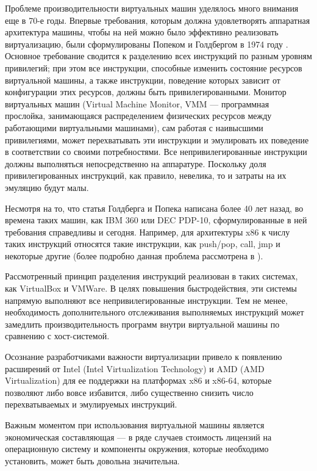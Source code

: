 Проблеме производительности виртуальных машин уделялось много внимания еще в 70-е годы. Впервые требования, которым должна удовлетворять аппаратная архитектура машины, чтобы на ней можно было эффективно реализовать виртуализацию, были сформулированы Попеком и Голдбергом в 1974 году \cite{popek1974formal}. Основное требование сводится к разделению всех инструкций по разным уровням привилегий; при этом все инструкции, способные изменить состояние ресурсов виртуальной машины, а также инструкции, поведение которых зависит от конфигурации этих ресурсов, должны быть привилегированными. Монитор виртуальных машин (Virtual Machine Monitor, VMM — программная прослойка, занимающаяся распределением физических ресурсов между работающими виртуальными машинами), сам работая с наивысшими привилегиями, может перехватывать эти инструкции и эмулировать их поведение в соответствии со своими потребностями. Все непривилегированные инструкции должны выполняться непосредственно на аппаратуре. Поскольку доля привилегированных инструкций, как правило, невелика, то и затраты на их эмуляцию будут малы.

Несмотря на то, что статья Голдберга и Попека написана более 40 лет назад, во времена таких машин, как IBM 360 или DEC PDP-10, сформулированные в ней требования справедливы и сегодня. Например, для архитектуры x86 к числу таких инструкций относятся такие инструкции, как push/pop, call, jmp и некоторые другие (более подробно данная проблема рассмотрена в \cite{kasp}).

Рассмотренный принцип разделения инструкций реализован в таких системах, как VirtualBox\cite{virtualbox} и VMWare\cite{vmware}. В целях повышения быстродействия, эти системы напрямую выполняют все непривилегированные инструкции. Тем не менее, необходимость дополнительного отслеживания выполняемых инструкций может замедлить производительность программ внутри виртуальной машины по сравнению с хост-системой.

Осознание разработчиками важности виртуализации привело к появлению расширений от Intel (Intel Virtualization Technology\cite{vtx}) и AMD (AMD Virtualization\cite{amd}) для ее поддержки на платформах x86 и x86-64, которые позволяют либо вовсе избавится, либо существенно снизить число перехватываемых и эмулируемых инструкций.

Важным моментом при использования виртуальной машины является экономическая составляющая — в ряде случаев стоимость лицензий на операционную систему и компоненты окружения, которые необходимо установить, может быть довольна значительна.

